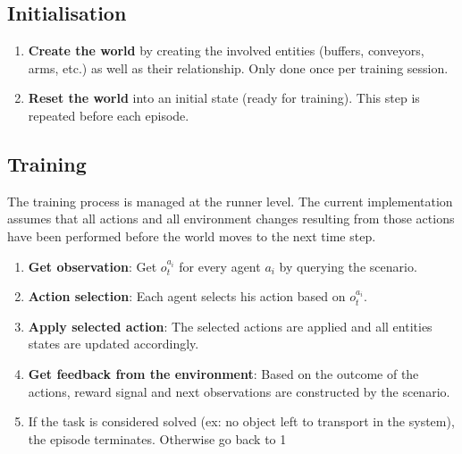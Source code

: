 \subsection*{Initialisation}

\begin{enumerate}[noitemsep,topsep=0pt,parsep=0pt,partopsep=0pt,label=(\arabic*)]
\item \textbf{Create the world} by creating the involved entities (buffers, conveyors, arms, etc.) as well as their relationship. Only done once per training session.
\item \textbf{Reset the world} into an initial state (ready for training). This step is repeated before each episode.
\end{enumerate}

\subsection*{Training}

The training process is managed at the runner level. The current implementation assumes that all actions and all environment changes resulting from those actions have been performed before the world moves to the next time step. 

\begin{enumerate}[noitemsep,topsep=0pt,parsep=0pt,partopsep=0pt,label=(\arabic*)]
\item \textbf{Get observation}: Get $o_t^{a_i}$ for every agent $a_i$ by querying the scenario.
\item \textbf{Action selection}: Each agent selects his action based on $o_t^{a_i}$.
\item \textbf{Apply selected action}: The selected actions are applied and all entities states are updated accordingly.
\item \textbf{Get feedback from the environment}: Based on the outcome of the actions, reward signal and next observations are constructed by the scenario.
\item If the task is considered solved (ex: no object left to transport in the system), the episode terminates. Otherwise go back to 1
\end{enumerate}

